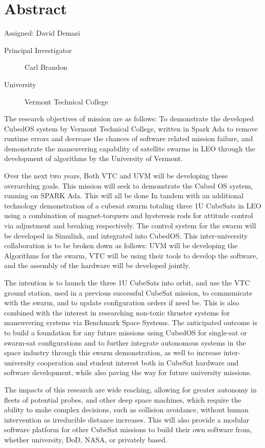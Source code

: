 \section{Abstract}
Assigned: David Demasi \cite{brandon:2008}

\begin{description}
\item[Principal Investigator] Carl Brandon
\item[University] Vermont Technical College
\end{description}

The research objectives of mission are as follows:  To demonstrate the developed CubedOS system by Vermont Technical College, written in Spark Ada to remove runtime errors and decrease the chances of software related mission failure, and demonstrate the maneuvering capability of satellite swarms in LEO through the development of algorithms by the University of Vermont.

Over the next two years, Both VTC and UVM will be developing these overarching goals. This mission will seek to demonstrate the Cubed OS system, running on SPARK Ada. This will all be done In tandem with an additional technology demonstration of a cubesat swarm totaling three 1U CubeSats in LEO using a combination of magnet-torquers and hysteresis rods for attitude control via adjustment and breaking respectively. The control system for the swarm will be developed in Simulink, and integrated into CubedOS. 
This inter-university collaboration is to be broken down as follows: UVM will be developing the Algorithms for the swarm, VTC will be using their tools to develop the software, and the assembly of the hardware will be developed jointly.

 The intention is to launch the three 1U CubeSats into orbit, and use the VTC ground station, used in a previous successful CubeSat mission, to communicate with the swarm, and to update configuration orders if need be. This is also combined with the interest in researching non-toxic thruster systems for maneuvering systems via Benchmark Space Systems.
	The anticipated outcome is to build a foundation for any future missions using CubedOS for single-sat or swarm-sat configurations and to further integrate autonomous systems in the space industry through this swarm demonstration, as well to increase inter-university cooperation and student interest both in CubeSat hardware and software development, while also paving the way for future university missions.
	
The impacts of this research are wide reaching, allowing for greater autonomy in fleets of potential probes, and other deep space machines, which require the ability to make complex decisions, such as collision avoidance, without human intervention as irreducible distance increases. This will also provide a modular software platform for other CubeSat missions to build their own software from, whether university, DoD, NASA, or privately based.



